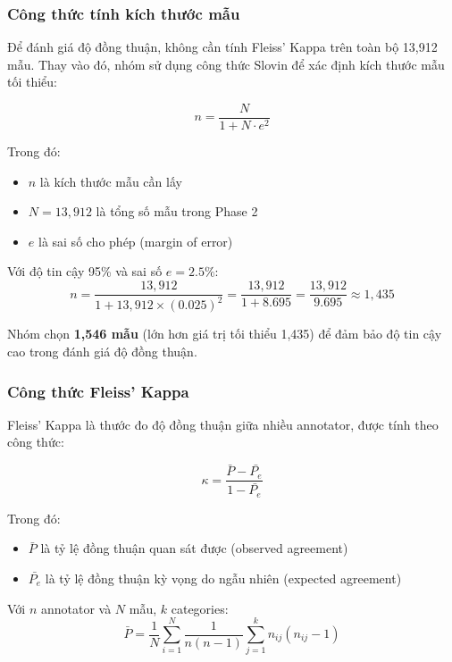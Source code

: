 \subsubsection{Công thức tính kích thước mẫu}
Để đánh giá độ đồng thuận, không cần tính Fleiss' Kappa trên toàn bộ 13,912 mẫu. Thay vào đó, nhóm sử dụng công thức Slovin để xác định kích thước mẫu tối thiểu:

\begin{equation}
n = \frac{N}{1 + N \cdot e^2}
\end{equation}

Trong đó:
\begin{itemize}
    \item $n$ là kích thước mẫu cần lấy
    \item $N = 13,912$ là tổng số mẫu trong Phase 2
    \item $e$ là sai số cho phép (margin of error)
\end{itemize}

Với độ tin cậy 95\% và sai số $e = 2.5\%$:
\begin{equation}
n = \frac{13,912}{1 + 13,912 \times (0.025)^2} = \frac{13,912}{1 + 8.695} = \frac{13,912}{9.695} \approx 1,435
\end{equation}

Nhóm chọn \textbf{1,546 mẫu} (lớn hơn giá trị tối thiểu 1,435) để đảm bảo độ tin cậy cao trong đánh giá độ đồng thuận.

\subsubsection{Công thức Fleiss' Kappa}
Fleiss' Kappa là thước đo độ đồng thuận giữa nhiều annotator, được tính theo công thức:

\begin{equation}
\kappa = \frac{\bar{P} - \bar{P_e}}{1 - \bar{P_e}}
\end{equation}

Trong đó:
\begin{itemize}
    \item $\bar{P}$ là tỷ lệ đồng thuận quan sát được (observed agreement)
    \item $\bar{P_e}$ là tỷ lệ đồng thuận kỳ vọng do ngẫu nhiên (expected agreement)
\end{itemize}

Với $n$ annotator và $N$ mẫu, $k$ categories:
\begin{equation}
\bar{P} = \frac{1}{N} \sum_{i=1}^{N} \frac{1}{n(n-1)} \sum_{j=1}^{k} n_{ij}(n_{ij}-1)
\end{equation}

